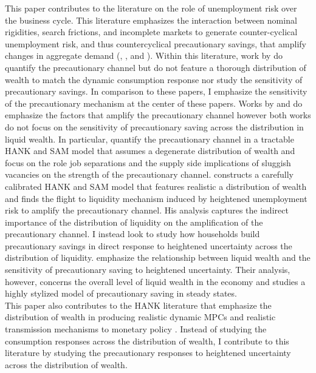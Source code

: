 \documentclass[titlepage]{\econtex}\providecommand{\texname}{Dissertation-Proposal}
\begin{document}
This paper contributes to the literature on the role of unemployment risk over the business cycle.  This literature emphasizes the interaction between nominal rigidities, search frictions, and incomplete markets to generate counter-cyclical unemployment risk, and thus countercyclical precautionary savings, that amplify changes in aggregate demand  (\cite{den2018unemployment}, \cite{leduc2016uncertainty}, and \cite{ravn2017job}). Within this literature, work by \cite{challe2017precautionary} do quantify the precautionary channel but do not feature a thorough distribution of wealth to match the dynamic consumption response nor study the sensitivity of precautionary savings. In comparison to these papers, I emphasize the sensitivity of the precautionary mechanism at the center of these papers. Works by \cite{Graves2022} and \cite{broer2021unemployment} do emphasize the factors that amplify the precautionary channel however both works do not focus on the sensitivity of precautionary saving across the distribution in liquid wealth. In particular, \cite{broer2021unemployment} quantify the precautionary channel in a tractable HANK and SAM model that assumes a degenerate distribution of wealth and focus on the role job separations and the supply side implications of sluggish vacancies on the strength of the precautionary channel. \cite{Graves2022} constructs a carefully calibrated HANK and SAM model that features realistic a distribution of wealth and finds the flight to liquidity mechanism induced by heightened unemployment risk to amplify the precautionary channel. His analysis captures the indirect importance of the distribution of liquidity on the amplification of the precautionary channel. I instead look to study how households build precautionary savings in direct response to heightened uncertainty across the distribution of liquidity.  \cite{heathcote2018wealth} emphasize the relationship between liquid wealth and the sensitivity of precautionary saving to heightened uncertainty. Their analysis, however, concerns the overall level of liquid wealth in the economy and studies a highly stylized model of precautionary saving in steady states.\\

This paper also contributes to the HANK literature that emphasize the distribution of wealth in producing realistic dynamic MPCs \cite{auclert2018intertemporal} and realistic transmission mechanisms to monetary policy \cite{kaplan2018monetary, auclert2019monetary}. Instead of studying the consumption responses across the distribution of wealth, I contribute to this literature by studying the precautionary responses to heightened uncertainty across the distribution of wealth.\\
\end{document}
